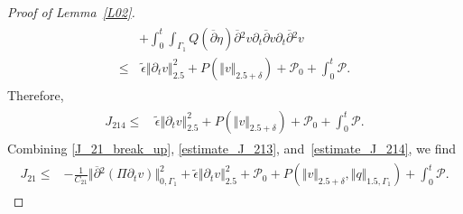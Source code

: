 \documentclass[10pt,reqno]{amsart}
\makeatletter
\theoremstyle{plain}
\theoremstyle{definition}
\numberwithin{equation}{section}
\newcommand{\ccP}{\mathscr{P}}
\newcommand{\ccPz}{\mathscr{P}_0}
\newcommand{\Ga}{\Gamma}
\newcommand{\de}{\delta}
\newcommand{\norm}[1]{\Vert#1\Vert}
\def\paragraph{\@startsection{paragraph}{4}%
  \z@\z@{-\fontdimen2\font}%
  {\normalfont\it}}
\makeatother
\begin{document}
\begin{proof}[Proof of Lemma~\ref{L02}]
\begin{align}
\begin{split}
&
+ 
\int_0^t \int_{\Ga_1}  Q(\overline{\partial} \eta)
\overline{\partial}{}^2 v
\partial_t \overline{\partial} v  \partial_t \overline{\partial}{}^2 v
\\
\leq &
\, 
\widetilde{\epsilon} \norm{\partial_t v}^2_{2.5} + P(\norm{v}_{2.5+\de})
+
\ccPz
+ \int_0^t \ccP.
\end{split}
\nonumber
\end{align}
Therefore,
\begin{align}
\begin{split}
J_{214} \leq &
\, \widetilde{\epsilon} \norm{\partial_t v}^2_{2.5} + P( \norm{v}_{2.5+\de}) 
+
\ccPz
+\int_{0}^{t}\ccP.
\end{split}
\label{estimate_J_214}
\end{align}
Combining \eqref{J_21_break_up}, \eqref{estimate_J_213},
and~\eqref{estimate_J_214}, we find
\begin{align}
\begin{split}
J_{21}  \leq &
- \frac{1}{C_{21}} \norm{ \overline{\partial}{}^2 (\Pi \partial_t v)}^2_{0,\Ga_1}
+
\widetilde{\epsilon}  \norm{ \partial_t v}_{2.5}^2
+\ccPz
+ P(  \norm{v}_{2.5+\de},\norm{q}_{1.5,\Ga_1})
+
\int_{0}^{t}\ccP.
\end{split}
\label{estimate_J_21}
\end{align}



\end{proof}
\end{document}
